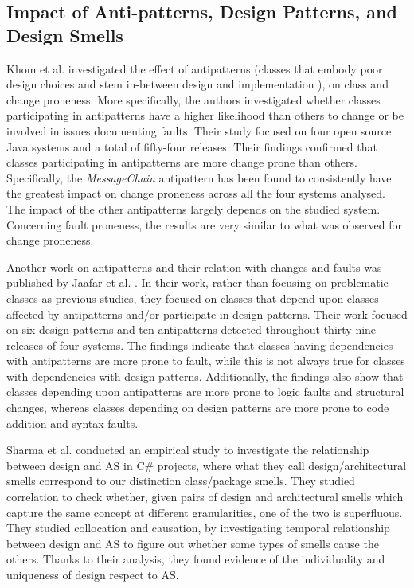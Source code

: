 \subsection{Impact of Anti-patterns, Design Patterns, and Design Smells}
Khom et al.  \cite{Khomh2012} investigated the effect of antipatterns (classes that embody poor design choices and stem in-between design and implementation \cite{Khomh2012}),  on class and change proneness. More specifically, the authors investigated whether classes participating in antipatterns have a higher likelihood than others to change or be involved in issues documenting faults.
Their study focused on four open source Java systems and a total of fifty-four releases. Their findings confirmed that classes participating in antipatterns are more change prone than others. Specifically, the \emph{MessageChain} antipattern has been found to consistently have the greatest impact on change proneness across all the four systems analysed. The impact of the other antipatterns largely depends on the studied system.
Concerning fault proneness, the results are very similar to what was observed for change proneness.

Another work on antipatterns and their relation with changes and faults was published by Jaafar et al. \cite{Jaafar2016}.
In their work, rather than focusing on problematic classes as previous studies, they focused on classes that depend upon classes affected by antipatterns and/or participate in design patterns.
Their work focused on six design patterns and ten antipatterns detected throughout thirty-nine releases of four systems.
The findings indicate that classes having dependencies with antipatterns are more prone to fault, while this is not always true for classes with dependencies with design patterns.
Additionally, the findings also show that classes depending upon antipatterns are more prone to logic faults and structural changes, whereas classes depending on design patterns are more prone to code addition and syntax faults.

Sharma et al. \cite{Sharma2020} conducted an empirical study to investigate the relationship between design and AS in C\# projects, where what they call design/architectural smells correspond to our distinction class/package smells. They studied correlation to check whether, given pairs of design and architectural smells which capture the same concept at different granularities, one of the two is superfluous. They studied collocation and
causation, by investigating temporal relationship between design and AS to figure out whether some types of smells cause the others. Thanks to their analysis, they found evidence of the individuality and uniqueness of design respect to AS.


